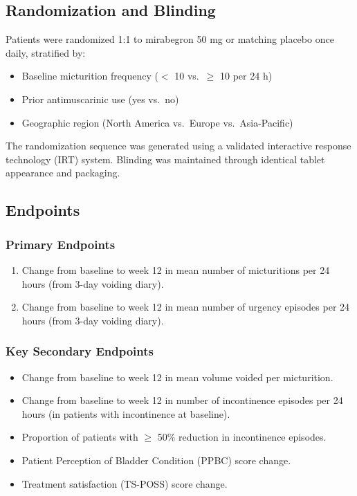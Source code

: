 \documentclass[
    language=english,
    doctype=clinical-report,
    institution=none,
]{../../omnilatex}
\begin{document}
\subsection{Randomization and Blinding}

Patients were randomized 1:1 to mirabegron 50 mg or matching placebo once
daily, stratified by:
\begin{itemize}
    \item Baseline micturition frequency ($<$ 10 vs.\ $\geq$ 10 per 24 h)
    \item Prior antimuscarinic use (yes vs.\ no)
    \item Geographic region (North America vs.\ Europe vs.\ Asia-Pacific)
\end{itemize}

The randomization sequence was generated using a validated interactive
response technology (IRT) system. Blinding was maintained through identical
tablet appearance and packaging.

\subsection{Endpoints}

\subsubsection{Primary Endpoints}
\begin{enumerate}
    \item Change from baseline to week 12 in mean number of micturitions
          per 24 hours (from 3-day voiding diary).
    \item Change from baseline to week 12 in mean number of urgency episodes
          per 24 hours (from 3-day voiding diary).
\end{enumerate}

\subsubsection{Key Secondary Endpoints}
\begin{itemize}
    \item Change from baseline to week 12 in mean volume voided per micturition.
    \item Change from baseline to week 12 in number of incontinence episodes
          per 24 hours (in patients with incontinence at baseline).
    \item Proportion of patients with $\geq$ 50\% reduction in incontinence
          episodes.
    \item Patient Perception of Bladder Condition (PPBC) score change.
    \item Treatment satisfaction (TS-POSS) score change.
\end{itemize}
\end{document}
